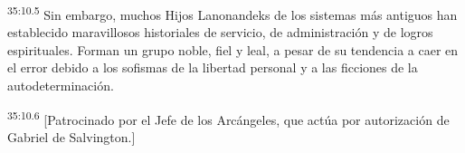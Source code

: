 \par
\textsuperscript{35:10.5} Sin embargo, muchos Hijos Lanonandeks de los sistemas más antiguos han establecido maravillosos historiales de servicio, de administración y de logros espirituales. Forman un grupo noble, fiel y leal, a pesar de su tendencia a caer en el error debido a los sofismas de la libertad personal y a las ficciones de la autodeterminación.

\par
\textsuperscript{35:10.6} [Patrocinado por el Jefe de los Arcángeles, que actúa por autorización de Gabriel de Salvington.]